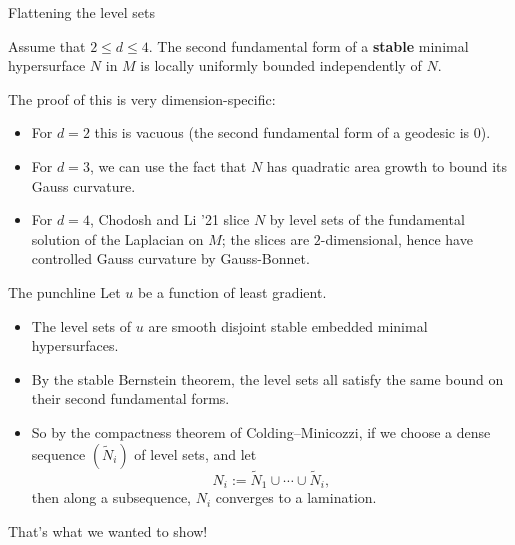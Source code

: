 \documentclass[10pt]{beamer}
\begin{document}
\begin{frame}{Flattening the level sets}

\begin{theorem}
Assume that $2 \leq d \leq 4$.
The second fundamental form of a \textbf{stable} minimal hypersurface $N$ in $M$ is locally uniformly bounded independently of $N$.
\end{theorem}\pause

The proof of this is very dimension-specific:\pause
\begin{itemize}
\item For $d = 2$ this is vacuous (the second fundamental form of a geodesic is $0$).\pause
\item For $d = 3$, we can use the fact that $N$ has quadratic area growth to bound its Gauss curvature.\pause
\item For $d = 4$, Chodosh and Li '21 slice $N$ by level sets of the fundamental solution of the Laplacian on $M$; the slices are $2$-dimensional, hence have controlled Gauss curvature by Gauss-Bonnet.
\end{itemize}
\end{frame}

\begin{frame}{The punchline}
Let $u$ be a function of least gradient.\pause

\begin{itemize}
\item The level sets of $u$ are smooth disjoint stable embedded minimal hypersurfaces.\pause
\item By the stable Bernstein theorem, the level sets all satisfy the same bound on their second fundamental forms.\pause
\item So by the compactness theorem of Colding--Minicozzi, if we choose a dense sequence $(\tilde N_i)$ of level sets, and let
$$N_i := \tilde N_1 \cup \cdots \cup \tilde N_i,$$
then along a subsequence, $N_i$ converges to a lamination.\pause
\end{itemize}

That's what we wanted to show!
\end{frame}
\end{document}
